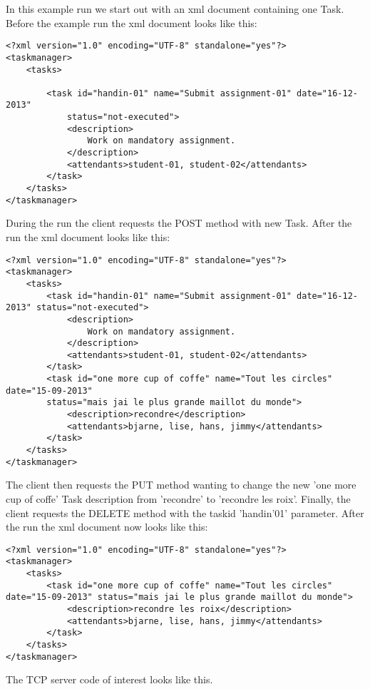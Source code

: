 In this example run we start out with an xml document containing one Task. Before the example run the xml document looks like this:

\begin{lstlisting}[caption=xml before run]
<?xml version="1.0" encoding="UTF-8" standalone="yes"?>
<taskmanager>
	<tasks>
		
		<task id="handin-01" name="Submit assignment-01" date="16-12-2013"
			status="not-executed">
			<description>
				Work on mandatory assignment.
			</description>
			<attendants>student-01, student-02</attendants>
		</task>	
	</tasks>
</taskmanager>

\end{lstlisting}

During the run the client requests the POST method with new Task. After the run the xml document looks like this:

\begin{lstlisting}[caption=xml after POST]
<?xml version="1.0" encoding="UTF-8" standalone="yes"?>
<taskmanager>
	<tasks>
		<task id="handin-01" name="Submit assignment-01" date="16-12-2013" status="not-executed">
			<description>
				Work on mandatory assignment.
			</description>
			<attendants>student-01, student-02</attendants>
		</task>
		<task id="one more cup of coffe" name="Tout les circles" date="15-09-2013" 
		status="mais jai le plus grande maillot du monde">
			<description>recondre</description>
			<attendants>bjarne, lise, hans, jimmy</attendants>
		</task>
	</tasks>
</taskmanager>
\end{lstlisting}

The client then requests the PUT method wanting to change the new 'one more cup of coffe' Task description from 'recondre' to 'recondre les roix'. Finally, the client requests the DELETE method with the taskid 'handin'01' parameter. After the run the xml document now looks like this:

\begin{lstlisting}[caption=xml after PUT]
<?xml version="1.0" encoding="UTF-8" standalone="yes"?>
<taskmanager>
	<tasks>
		<task id="one more cup of coffe" name="Tout les circles" date="15-09-2013" status="mais jai le plus grande maillot du monde">
			<description>recondre les roix</description>
			<attendants>bjarne, lise, hans, jimmy</attendants>
		</task>
	</tasks>
</taskmanager>
\end{lstlisting}

\pagebreak

The TCP server code of interest looks like this.
% 


